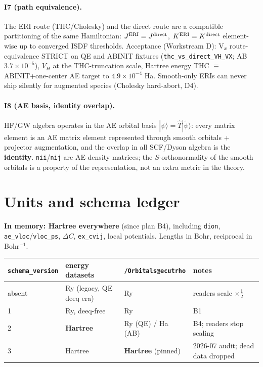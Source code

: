 \documentclass[11pt]{article}
\newcommand{\code}[1]{\texttt{#1}}
\newcommand{\ket}[1]{|#1\rangle}
\begin{document}
\paragraph{I7 (path equivalence).} The ERI route (THC/Cholesky) and the
direct route are a compatible partitioning of the same Hamiltonian:
$J^{\rm ERI}=J^{\rm direct}$, $K^{\rm ERI}=K^{\rm direct}$ element-wise up
to converged ISDF thresholds. Acceptance (Workstream D): V$_x$
route-equivalence STRICT on QE and ABINIT fixtures
(\code{thc\_vs\_direct\_VH\_VX}; AB $3.7\times10^{-5}$), $V_H$ at the
THC-truncation scale, Hartree energy THC $\equiv$ ABINIT+one-center AE
target to $4.9\times10^{-4}$ Ha. Smooth-only ERIs can never ship silently
for augmented species (Cholesky hard-abort, D4).

\paragraph{I8 (AE basis, identity overlap).} HF/GW algebra operates in the
AE orbital basis $\ket{\psi}=\hat T\ket{\tilde\psi}$: every matrix element
is an AE matrix element represented through smooth orbitals + projector
augmentation, and the overlap in all SCF/Dyson algebra is the
\textbf{identity}. \code{nii}/\code{nij} are AE density matrices; the
$S$-orthonormality of the smooth orbitals is a property of the
representation, not an extra metric in the theory.

\section{Units and schema ledger}
\label{sec:units}

\textbf{In memory: Hartree everywhere} (since plan B4), including
\code{dion}, \code{ae\_vloc}/\code{vloc\_ps}, $\Delta C$, \code{ex\_cvij},
local potentials. Lengths in Bohr, reciprocal in Bohr$^{-1}$.

\begin{center}
\begin{tabular}{@{}llll@{}}
\toprule
\code{schema\_version} & energy datasets & \code{/Orbitals@ecutrho} & notes\\
\midrule
absent & Ry (legacy, QE deeq era) & Ry & readers scale $\times\tfrac12$\\
1 & Ry, deeq-free & Ry & B1\\
2 & \textbf{Hartree} & Ry (QE) / Ha (AB) & B4; readers stop scaling\\
3 & Hartree & \textbf{Hartree} (pinned) & 2026-07 audit; dead data dropped\\
\bottomrule
\end{tabular}
\end{center}
\end{document}

